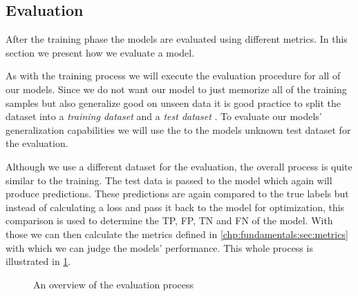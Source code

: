 \subsection{Evaluation}
\label{chp:study:sec:design:subsec:evaluation}
After the training phase the models are evaluated using different metrics.
In this section we present how we evaluate a model.

As with the training process we will execute the evaluation procedure for all of our models.
Since we do not want our model to just memorize all of the training samples but also generalize good on unseen data it is good practice to split the dataset into a \textit{training dataset} and a \textit{test dataset} \parencite{Reitermanova:2010}.
To evaluate our models' generalization capabilities we will use the to the models unknown test dataset for the evaluation.

Although we use a different dataset for the evaluation, the overall process is quite similar to the training.
The test data is passed to the model which again will produce predictions.
These predictions are again compared to the true labels but instead of calculating a loss and pass it back to the model for optimization, this comparison is used to determine the \ac{TP}, \ac{FP}, \ac{TN} and \ac{FN} of the model.
With those we can then calculate the metrics defined in \cref{chp:fundamentals:sec:metrics} with which we can judge the models' performance.
This whole process is illustrated in \cref{fig:study:design:evaluation}.

\newpage
\begin{figure}[htpb]
    \centering
    \def\svgwidth{\columnwidth}
    
    \caption[Study Design: Evaluation]{An overview of the evaluation process}\label{fig:study:design:evaluation}
\end{figure}
